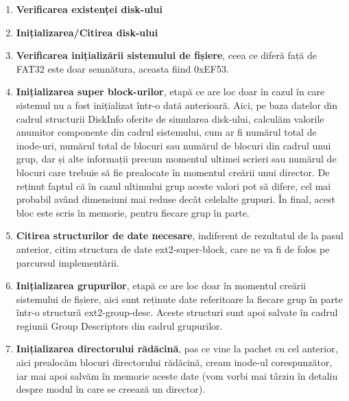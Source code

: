 \begin{enumerate}
  \item \textbf{Verificarea existenței disk-ului}

  \item \textbf{Inițializarea/Citirea disk-ului}

  \item \textbf{Verificarea inițializării sistemului de fișiere}, ceea ce diferă față de FAT32 este doar semnătura, aceasta fiind 0xEF53.

  \item \textbf{Inițializarea super block-urilor}, etapă ce are loc doar în cazul în care sistemul nu a fost inițializat într-o dată anterioară. Aici, pe baza datelor din cadrul structurii DiskInfo oferite de simularea disk-ului, calculăm valorile anumitor componente din cadrul sistemului, cum ar fi numărul total de inode-uri, numărul total de blocuri sau numărul de blocuri din cadrul unui grup, dar și alte informații precum momentul ultimei scrieri sau numărul de blocuri care trebuie să fie prealocate în momentul creării unui director. De reținut faptul că în cazul ultimului grup aceste valori pot să difere, cel mai probabil având dimensiuni mai reduse decât celelalte grupuri. În final, acest bloc este scris în memorie, pentru fiecare grup în parte.

 \item \textbf{Citirea structurilor de date necesare}, indiferent de rezultatul de la pasul anterior, citim structura de date ext2-super-block, care ne va fi de folos pe parcursul implementării.
 \item \textbf{Inițializarea grupurilor}, etapă ce are loc doar în momentul creării sistemului de fișiere, aici sunt reținute date referitoare la fiecare grup în parte într-o structură ext2-group-desc. Aceste structuri sunt apoi salvate în cadrul regiunii Group Descriptors din cadrul grupurilor.

\item \textbf{Inițializarea directorului rădăcină}, pas ce vine la pachet cu cel anterior, aici prealocăm blocuri directorului rădăcină, cream inode-ul corespunzător, iar mai apoi salvăm în memorie aceste date (vom vorbi mai târziu în detaliu despre modul în care se creează un director).
  
\end{enumerate}

\bigskip

